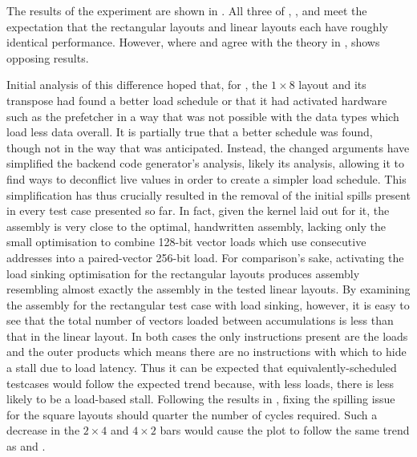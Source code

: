 \documentclass[\main/thesis.tex]{subfiles}
\begin{document}
The results of the experiment are shown in .
All three of , , and  meet the expectation that the rectangular layouts and linear layouts each have roughly identical performance.
However, where  and  agree with the theory in ,  shows opposing results.

Initial analysis of this difference hoped that, for , the $1 \times 8$ layout and its transpose had found a better load schedule or that it had activated hardware such as the prefetcher in a way that was not possible with the data types which load less data overall.
It is partially true that a better schedule was found, though not in the way that was anticipated.
Instead, the changed arguments have simplified the backend code generator's analysis, likely its  analysis, allowing it to find ways to deconflict \gls{live} values in order to create a simpler load schedule.
This simplification has thus crucially resulted in the removal of the initial spills present in every test case presented so far.
In fact, given the kernel laid out for it, the assembly is very close to the optimal, handwritten assembly, lacking only the small optimisation to combine 128-bit vector loads which use consecutive addresses into a paired-vector 256-bit load.
For comparison's sake, activating the load sinking optimisation for the rectangular layouts produces assembly resembling almost exactly the assembly in the tested linear layouts\footnotemark.
By examining the assembly for the rectangular test case with load sinking, however, it is easy to see that the total number of vectors loaded between accumulations is less than that in the linear layout.
In both cases the only instructions present are the loads and the outer products which means there are no instructions with which to hide a stall due to load latency.
Thus it can be expected that equivalently-scheduled  testcases would follow the expected trend because, with less loads, there is less likely to be a load-based stall.
Following the results in , fixing the spilling issue for the  square layouts should quarter the number of cycles required.
Such a decrease in the $2 \times 4$ and $4 \times 2$ bars would cause the  plot to follow the same trend as  and .
\end{document}
